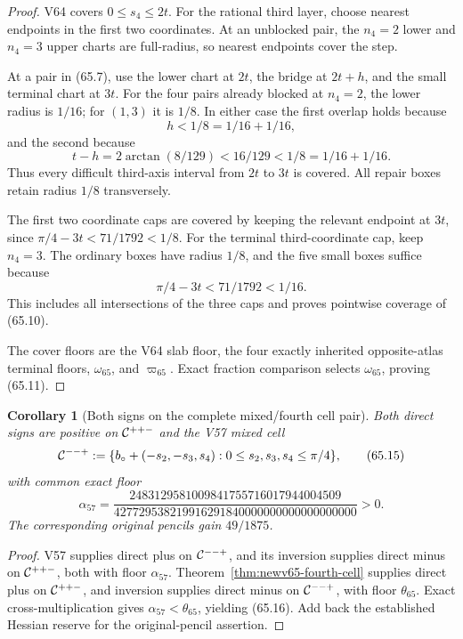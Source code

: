 \documentclass[11pt,oneside]{article}
\newtheorem{corollary}[theorem]{Corollary}
\theoremstyle{definition}
\theoremstyle{remark}
\begin{document}
\begin{proof}
V64 covers \(0\le s_4\le2t\).  For the rational third layer,
choose nearest endpoints in the first two coordinates.  At an
unblocked pair, the \(n_4=2\) lower and \(n_4=3\) upper charts are
full-radius, so nearest endpoints cover the step.

At a pair in (65.7), use the lower chart at \(2t\), the bridge at
\(2t+h\), and the small terminal chart at \(3t\).  For the four
pairs already blocked at \(n_4=2\), the lower radius is \(1/16\);
for \((1,3)\) it is \(1/8\).  In either case the first overlap holds
because
\[
 h<1/8=1/16+1/16,                                    \tag{65.12}
\]
and the second because
\[
 t-h=2\arctan(8/129)<16/129<1/8=1/16+1/16.          \tag{65.13}
\]
Thus every difficult third-axis interval from \(2t\) to \(3t\) is
covered.  All repair boxes retain radius \(1/8\) transversely.

The first two coordinate caps are covered by keeping the relevant
endpoint at \(3t\), since \(\pi/4-3t<71/1792<1/8\).  For the
terminal third-coordinate cap, keep \(n_4=3\).  The ordinary boxes
have radius \(1/8\), and the five small boxes suffice because
\[
 \pi/4-3t<71/1792<1/16.                              \tag{65.14}
\]
This includes all intersections of the three caps and proves
pointwise coverage of (65.10).

The cover floors are the V64 slab floor, the four exactly inherited
opposite-atlas terminal floors, \(\omega_{65}\), and
\(\varpi_{65}\).  Exact fraction comparison selects
\(\omega_{65}\), proving (65.11).
\end{proof}

\begin{corollary}[Both signs on the complete mixed/fourth cell pair]
\label{cor:newv65-paired-complete-cells}
Both direct signs are positive on \({\cal C}^{++-}\) and the V57
mixed cell
\[
 {\cal C}^{--+}:=
 \{b_\circ+(-s_2,-s_3,s_4):
       0\le s_2,s_3,s_4\le\pi/4\},                   \tag{65.15}
\]
with common exact floor
\[
 \alpha_{57}=
 \frac{2483129581009841755716017944004509}
 {427729538219916291840000000000000000000}>0.         \tag{65.16}
\]
The corresponding original pencils gain \(49/1875\).
\end{corollary}

\begin{proof}
V57 supplies direct plus on \({\cal C}^{--+}\), and its inversion
supplies direct minus on \({\cal C}^{++-}\), both with floor
\(\alpha_{57}\).  Theorem~\ref{thm:newv65-fourth-cell} supplies
direct plus on \({\cal C}^{++-}\), and inversion supplies direct
minus on \({\cal C}^{--+}\), with floor \(\theta_{65}\).
Exact cross-multiplication gives
\(\alpha_{57}<\theta_{65}\), yielding (65.16).  Add back the
established Hessian reserve for the original-pencil assertion.
\end{proof}
\end{document}

